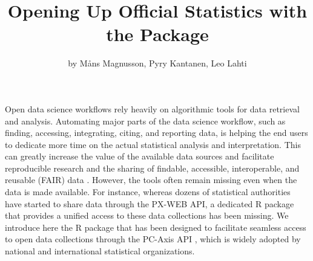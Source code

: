 \title{Opening Up Official Statistics with the  Package}
\author{by Måns Magnusson, Pyry Kantanen, Leo Lahti}


\maketitle





Open data science workflows rely heavily on algorithmic tools for data
retrieval and analysis. Automating major parts of the data science
workflow, such as finding, accessing, integrating, citing, and
reporting data, is helping the end users to dedicate more time on the
actual statistical analysis and interpretation. This can greatly
increase the value of the available data sources and facilitate
reproducible research \citep{Gandrud13, Boettiger2015} and the sharing
of findable, accessible, interoperable, and reusable (FAIR) data
\cite{xxx}. However, the tools often remain missing even when
the data is made available. For instance, whereas dozens of
statistical authorities have started to share data through the PX-WEB
API, a dedicated R package that provides a unified access to these
data collections has been missing. We introduce here the  R
package that has been designed to facilitate seamless access to open
data collections through the PC-Axis API \cite{xxx}, which is widely
adopted by national and international statistical organizations.

